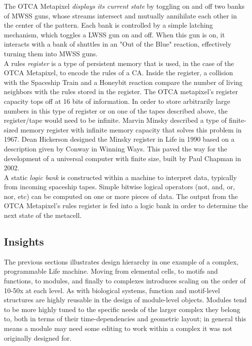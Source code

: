 {The OTCA Metapixel \textit{displays its current state} by toggling on and off two banks of MWSS guns, whose streams intersect and mutually annihilate each other in the center of the pattern.  Each bank is controlled by a simple latching mechanism, which toggles a LWSS gun on and off.  When this gun is on, it interacts with a bank of shuttles in an "Out of the Blue" reaction, effectively turning them into MWSS guns.\\

A rules \textit{register} is a type of persistent memory that is used, in the case of the OTCA Metapixel, to encode the rules of a CA.  Inside the register, a collision with the Spaceship Train and a Honeybit reaction compare the number of living neighbors with the rules stored in the register.  The OTCA metapixel's register capacity tops off at 16 bits of information.  In order to store arbitrarily large numbers in this type of register or on one of the tapes described above, the register/tape would need to be infinite.  Marvin Minsky described a type of finite-sized memory register with infinite memory capacity that solves this problem in 1967\cite{Minsky1967}.  Dean Hickerson designed the Minsky register in Life\cite{Hickerson1900} in 1990 based on a description given by Conway in Winning Ways\cite{Berekamp1982}.  This paved the way for the development of a universal computer with finite size, built by Paul Chapman in 2002\cite{Chapman2002}.\\

A static \textit{logic bank} is constructed within a machine to interpret data, typically from incoming spaceship tapes.  Simple bitwise logical operators (not, and, or, nor, etc) can be computed on one or more pieces of data.  The output from the OTCA Metapixel's rules register is fed into a logic bank in order to determine the next state of the metacell.

\subsection{Insights}

The previous sections illustrates design hierarchy in one example of a complex, programmable Life machine.  Moving from elemental cells, to motifs and functions, to modules, and finally to complexes introduces scaling on the order of 10-50x at each level.  As with biological systems, function and motif-level structures are highly reusable in the design of module-level objects.  Modules tend to be more highly tuned to the specific needs of the larger complex they belong to, both in terms of their time-dependencies and geometric layout; in general this means a module may need some editing to work within a complex it was not originally designed for.

}
